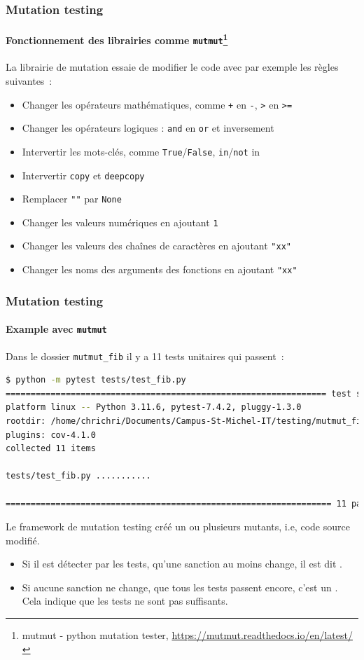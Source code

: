 \documentclass{beamer}
\begin{document}
    \begin{frame}
        \frametitle{Mutation testing}
        \framesubtitle{Fonctionnement des librairies comme \lstinline{mutmut}\footnote{mutmut - python mutation tester, \url{https://mutmut.readthedocs.io/en/latest/}}}
        \transdissolve
        La librairie de mutation essaie de modifier le code avec par exemple les règles suivantes~:
        \begin{itemize}
            \item Changer les opérateurs mathématiques, comme \lstinline{+} en \lstinline{-}, \lstinline{>} en \lstinline{>=}
            \item Changer les opérateurs logiques : \lstinline{and} en \lstinline{or} et inversement
            \item Intervertir les mots-clés, comme \lstinline{True}/\lstinline{False}, \lstinline{in}/\lstinline{not} in
            \item Intervertir \lstinline{copy} et \lstinline{deepcopy}
            \item Remplacer \lstinline{""} par \lstinline{None}
            \item Changer les valeurs numériques en ajoutant \lstinline{1}
            \item Changer les valeurs des chaînes de caractères en ajoutant \lstinline{"xx"}
            \item Changer les noms des arguments des fonctions en ajoutant \lstinline{"xx"}
        \end{itemize}
    \end{frame}


    \begin{frame}[fragile]
        \frametitle{Mutation testing}
        \framesubtitle{Example avec \lstinline{mutmut}}
        \transdissolve
        Dans le dossier \lstinline{mutmut_fib} il y a 11 tests unitaires qui passent~:
        \begin{lstlisting}[language=bash]
$ python -m pytest tests/test_fib.py
================================================================ test session starts ======
platform linux -- Python 3.11.6, pytest-7.4.2, pluggy-1.3.0
rootdir: /home/chrichri/Documents/Campus-St-Michel-IT/testing/mutmut_fib
plugins: cov-4.1.0
collected 11 items

tests/test_fib.py ...........                                                                                                                  [100%]

================================================================= 11 passed in 0.04s ======
        \end{lstlisting}
        Le framework de mutation testing créé un ou plusieurs mutants, i.e, code source modifié.
        \begin{itemize}
            \item Si il est détecter par les tests, qu'une sanction au moins change, il est dit .
            \item Si aucune sanction ne change, que tous les tests passent encore, c'est un . Cela indique que les tests ne sont pas suffisants.
        \end{itemize}
    \end{frame}
\end{document}
